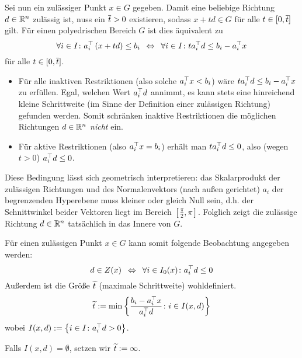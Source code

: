 
Sei nun ein zulässiger Punkt $x \in G$ gegeben. Damit eine beliebige Richtung $d \in \mathbb{R}^n$ zulässig ist, nuss ein $\overline{t} > 0$ existieren, sodass $x + td \in G$ für alle $t \in [0,\overline{t}]$ gilt.
Für einen polyedrischen Bereich $G$ ist dies äquivalent zu
\begin{equation*}
	\forall i \in I \colon a_i^{\top} \left( x + td \right) \le b_i \enskip \Leftrightarrow \enskip \forall i \in I \colon t a_i^{\top} d \le b_i - a_i^{\top} x
\end{equation*}
für alle $t \in [0,\overline{t}]$.

\begin{itemize}[nolistsep]%
	\item Für alle inaktiven Restriktionen (also solche $a_i^{\top} x < b_i$) wäre $t a_i^{\top} d \le b_i - a_i^{\top} x$ zu erfüllen. Egal, welchen Wert $a_i^{\top}d$ annimmt, es kann stets eine hinreichend kleine Schrittweite (im Sinne der Definition einer zulässigen Richtung) gefunden werden. Somit schränken inaktive Restriktionen die möglichen Richtungen $d \in \mathbb{R}^n$ \textit{nicht} ein.
	\item Für aktive Restriktionen (also $a_i^{\top} x = b_i$) erhält man $t a_i^{\top} d \le 0$, also (wegen $t > 0$) $a_i^{\top} d \le 0$.
\end{itemize}

Diese Bedingung lässt sich geometrisch interpretieren: 
das Skalarprodukt der zulässigen Richtungen und des Normalenvektors (nach außen gerichtet) $a_i$ der begrenzenden Hyperebene muss kleiner oder gleich Null sein, d.h. der Schnittwinkel beider Vektoren liegt im Bereich $[\frac{\pi}{2},\pi]$. Folglich zeigt die zulässige Richtung $d \in \mathbb{R}^n$ tatsächlich in das Innere von $G$.

Für einen zulässigen Punkt $x \in G$ kann somit folgende Beobachtung angegeben werden:
\begin{equation}
	d \in Z(x) \enskip \Leftrightarrow \enskip \forall i \in I_0(x) \colon a_i^{\top}d \le 0 \label{eq: 2.4}
\end{equation}
Außerdem ist die Größe $\widetilde{t}$ (maximale Schrittweite) wohldefiniert.
\begin{equation}
	\widetilde{t} \mathrel{:=} \min\left\{ \frac{b_i - a_i^{\top}x}{a_i^{\top}d} \colon i \in I(x,d) \right\} \label{eq: 2.5}
\end{equation}
wobei $I(x,d) \mathrel{:=} \left\{  i \in I \colon a_i^{\top}d > 0 \right\}$.

\begin{bemerkung} %
	Falls $I(x,d) = \emptyset$, setzen wir $\widetilde{t} \mathrel{:=} \infty$.
\end{bemerkung}

